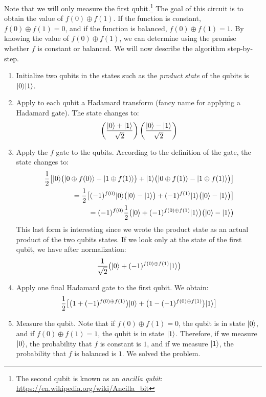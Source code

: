 \documentclass[12pt,a4paper]{article}
\theoremstyle{plain}
\theoremstyle{definition}
\DeclarePairedDelimiter\ket{\lvert}{\rangle}
\begin{document}
Note that we will only measure the first qubit.\footnote{The second qubit is known as an \emph{ancilla qubit}: \url{https://en.wikipedia.org/wiki/Ancilla_bit}} The goal of this circuit is to obtain the value of $f(0)\oplus f(1)$. If the function is constant, $f(0)\oplus f(1) = 0$, and if the function is balanced, $f(0)\oplus f(1) = 1$. By knowing the value of $f(0)\oplus f(1)$, we can determine using the promise whether $f$ is constant or balanced. We will now describe the algorithm step-by-step.

\begin{enumerate}
    \item Initialize two qubits in the states such as the \emph{product state} of the qubits is $\ket{0}\ket{1}$.
    \item Apply to each qubit a Hadamard transform (fancy name for applying a Hadamard gate). The state changes to:
    \begin{equation*}
        \left(\frac{\ket{0}+\ket{1}}{\sqrt{2}}\right) \left(\frac{\ket{0}-\ket{1}}{\sqrt{2}}\right)
    \end{equation*}
    \item Apply the $f$ gate to the qubits. According to the definition of the gate, the state changes to:
    \begin{align*}
        \frac{1}{2}\big[\ket{0}\big(\ket{0\oplus f(0)} - \ket{1\oplus f(1)}\big) + \ket{1}\big(\ket{0\oplus f(1)} - \ket{1\oplus f(1)}\big) \big] \\
        = \frac{1}{2}\big[(-1)^{f(0)}\ket{0}\big(\ket{0} - \ket{1}\big) + (-1)^{f(1)}\ket{1}\big(\ket{0} - \ket{1}\big) \big] \\
        = (-1)^{f(0)}\frac{1}{2}\big( \ket{0} + (-1)^{f(0)\oplus f(1)} \ket{1}\big)\big( \ket{0}-\ket{1}\big)
    \end{align*}
    This last form is interesting since we wrote the product state as an actual product of the two qubits states. If we look only at the state of the first qubit, we have after normalization:
    \begin{equation*}
        \frac{1}{\sqrt{2}}\big(\ket{0} + (-1)^{f(0)\oplus f(1)}\ket{1}\big)
    \end{equation*}
    \item Apply one final Hadamard gate to the first qubit. We obtain:
    \begin{equation*}
        \frac{1}{2} \big[ \big(1+(-1)^{f(0)\oplus f(1)}\big)\ket{0} + \big(1-(-1)^{f(0)\oplus f(1)}\big)\ket{1} \big]
    \end{equation*}
    \item Measure the qubit. Note that if $f(0)\oplus f(1) = 0$, the qubit is in state $\ket{0}$, and if $f(0)\oplus f(1) = 1$, the qubit is in state $\ket{1}$. Therefore, if we measure $\ket{0}$, the probability that $f$ is constant is $1$, and if we measure $\ket{1}$, the probability that $f$ is balanced is $1$. We solved the problem.
\end{enumerate}
\end{document}
